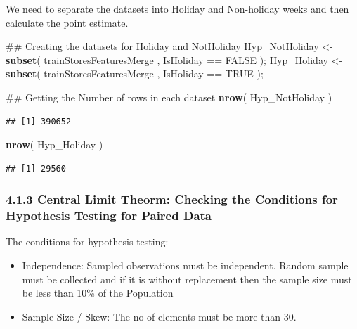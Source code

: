\documentclass[]{article}
\newenvironment{Shaded}{\begin{snugshade}}{\end{snugshade}}
\newcommand{\KeywordTok}[1]{\textcolor[rgb]{0.13,0.29,0.53}{\textbf{{#1}}}}
\newcommand{\StringTok}[1]{\textcolor[rgb]{0.31,0.60,0.02}{{#1}}}
\newcommand{\OtherTok}[1]{\textcolor[rgb]{0.56,0.35,0.01}{{#1}}}
\newcommand{\NormalTok}[1]{{#1}}
\begin{document}
We need to separate the datasets into Holiday and Non-holiday weeks and
then calculate the point estimate.

\begin{Shaded}
\begin{Highlighting}[]
\NormalTok{## Creating the datasets for Holiday and NotHoliday}
\NormalTok{Hyp_NotHoliday <-}\StringTok{ }\KeywordTok{subset}\NormalTok{( trainStoresFeaturesMerge , IsHoliday ==}\StringTok{ }\OtherTok{FALSE} \NormalTok{);}
\NormalTok{Hyp_Holiday <-}\StringTok{ }\KeywordTok{subset}\NormalTok{( trainStoresFeaturesMerge , IsHoliday ==}\StringTok{ }\OtherTok{TRUE} \NormalTok{);}

\NormalTok{## Getting the Number of rows in each dataset}
\KeywordTok{nrow}\NormalTok{( Hyp_NotHoliday )}
\end{Highlighting}
\end{Shaded}

\begin{verbatim}
## [1] 390652
\end{verbatim}

\begin{Shaded}
\begin{Highlighting}[]
\KeywordTok{nrow}\NormalTok{( Hyp_Holiday )}
\end{Highlighting}
\end{Shaded}

\begin{verbatim}
## [1] 29560
\end{verbatim}

\subsubsection{4.1.3 Central Limit Theorm: Checking the Conditions for
Hypothesis Testing for Paired
Data}\label{central-limit-theorm-checking-the-conditions-for-hypothesis-testing-for-paired-data}

The conditions for hypothesis testing:

\begin{itemize}
\itemsep1pt\parskip0pt
\item
  Independence: Sampled observations must be independent. Random sample
  must be collected and if it is without replacement then the sample
  size must be less than 10\% of the Population
\item
  Sample Size / Skew: The no of elements must be more than 30.
\end{itemize}
\end{document}

